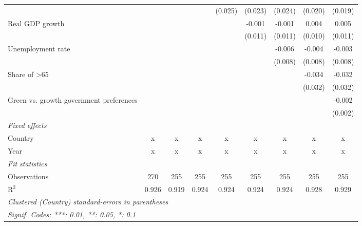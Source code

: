\begin{table}[htbp]
\begin{tabular}{lcccccccc}
                                              &                &                &         & (0.025) & (0.023) & (0.024) & (0.020) & (0.019)\\   
      Real GDP growth                         &                &                &         &         & -0.001  & -0.001  & 0.004   & 0.005\\   
                                              &                &                &         &         & (0.011) & (0.011) & (0.010) & (0.011)\\   
      Unemployment rate                       &                &                &         &         &         & -0.006  & -0.004  & -0.003\\   
                                              &                &                &         &         &         & (0.008) & (0.008) & (0.008)\\   
      Share of >65                            &                &                &         &         &         &         & -0.034  & -0.032\\   
                                              &                &                &         &         &         &         & (0.032) & (0.032)\\   
      Green vs. growth government preferences &                &                &         &         &         &         &         & -0.002\\   
                                              &                &                &         &         &         &         &         & (0.002)\\   
      \emph{Fixed effects}\\
      Country                                 & x              & x              & x       & x       & x       & x       & x       & x\\  
      Year                                    & x              & x              & x       & x       & x       & x       & x       & x\\  
      \midrule \emph{Fit statistics}\\
      Observations                            & 270            & 255            & 255     & 255     & 255     & 255     & 255     & 255\\  
      R$^2$                                   & 0.926          & 0.919          & 0.924   & 0.924   & 0.924   & 0.924   & 0.928   & 0.929\\  
      \midrule
      \multicolumn{9}{l}{\emph{Clustered (Country) standard-errors in parentheses}}\\
      \multicolumn{9}{l}{\emph{Signif. Codes: ***: 0.01, **: 0.05, *: 0.1}}\\
   \end{tabular}
\end{table}


